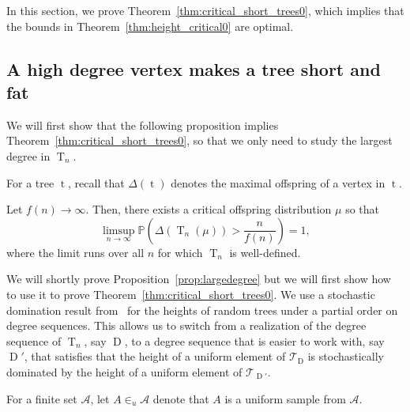 \documentclass[10pt]{amsart}
\theoremstyle{definition}\newtheorem{defi}[theo]{Definition}\newtheorem{rema}[theo]{Remark}\newtheorem{exam}[theo]{Example}\newtheorem{exem}[theo]{Example}\newtheorem{nota}[theo]{Notation}
\renewcommand{\P}{\mathbb{P}}
\DeclareMathOperator{\tree}{t}
\DeclareMathOperator{\rtree}{T}
\DeclareMathOperator{\Dseq}{D}
\newcommand\cA{\mathcal{A}}
\newcommand\cT{\mathcal{T}}
\begin{document}
In this section, we prove Theorem~\ref{thm:critical_short_trees0}, which implies that the bounds in Theorem~\ref{thm:height_critical0} are optimal.


\subsection{A high degree vertex makes a tree short and fat}

We will first show that the following proposition implies Theorem~\ref{thm:critical_short_trees0}, so that we only need to study the largest degree in $\rtree_n$.

For a tree $\tree$, recall that $\Delta(\tree)$ denotes the maximal offspring of a vertex in $\tree$.


\begin{prop}\label{prop:largedegree}
Let $f(n)\to \infty$. Then, there exists a critical offspring distribution $\mu$ so that
\[
\limsup_{n\to\infty}\P\left(\Delta(\rtree_n(\mu))>\frac{n}{f(n)}\right)=1,
\]
where the limit runs over all $n$ for which $\rtree_n$ is well-defined.
\end{prop}


We will shortly prove Proposition~\ref{prop:largedegree} but we will first show how to use it to prove Theorem~\ref{thm:critical_short_trees0}. We use a stochastic domination result from~\cite{AD22} for the heights of random trees under a partial order on degree sequences. This allows us to switch from a realization of the degree sequence of $\rtree_n$, say $\Dseq$, to a degree sequence that is easier to work with, say $\Dseq '$, that satisfies that the height of a uniform element of $\cT_{\Dseq}$ is stochastically dominated by the height of a uniform element of $\cT_{\Dseq '}$.

For a finite set $\cA$, let $A\in_u\cA$ denote that $A$ is a uniform sample from $\cA$.
\end{document}
